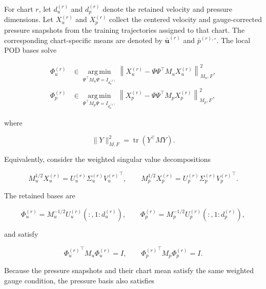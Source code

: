 \documentclass{article}
\begin{document}
For chart $r$, let $d_u^{(r)}$ and $d_p^{(r)}$ denote the retained velocity
and pressure dimensions.
Let $X_u^{(r)}$ and $X_p^{(r)}$ collect the centered velocity and
gauge-corrected pressure snapshots from the training trajectories assigned
to that chart.
The corresponding chart-specific means are denoted by
$\bar{\bm u}^{(r)}$ and $\bar p^{(r),\circ}$.
The local POD bases solve


\begin{align}
    \Phi_u^{(r)}
    &\in
    \underset{\Psi^\top M_u\Psi=I_{d_u^{(r)}}}
    {\operatorname{arg\,min}}
    \left\|
        X_u^{(r)}
        -\Psi\Psi^\top M_uX_u^{(r)}
    \right\|_{M_u,F}^2,
    \\
    \Phi_p^{(r)}
    &\in
    \underset{\Psi^\top M_p\Psi=I_{d_p^{(r)}}}
    {\operatorname{arg\,min}}
    \left\|
        X_p^{(r)}
        -\Psi\Psi^\top M_pX_p^{(r)}
    \right\|_{M_p,F}^2,
    \label{eq:app_pod_optimization}
\end{align}


where


\begin{equation}
    \|Y\|_{M,F}^2=\operatorname{tr}(Y^\top MY).
\end{equation}



Equivalently, consider the weighted singular value decompositions


\begin{equation}
    M_u^{1/2}X_u^{(r)}
    =
    U_u^{(r)}\Sigma_u^{(r)}{V_u^{(r)}}^\top,
    \qquad
    M_p^{1/2}X_p^{(r)}
    =
    U_p^{(r)}\Sigma_p^{(r)}{V_p^{(r)}}^\top.
\end{equation}


The retained bases are


\begin{equation}
    \Phi_u^{(r)}
    =
    M_u^{-1/2}
    U_u^{(r)}(:,1{:}d_u^{(r)}),
    \qquad
    \Phi_p^{(r)}
    =
    M_p^{-1/2}
    U_p^{(r)}(:,1{:}d_p^{(r)}),
    \label{eq:app_weighted_svd_bases}
\end{equation}


and satisfy


\begin{equation}
    {\Phi_u^{(r)}}^\top M_u\Phi_u^{(r)}=I,
    \qquad
    {\Phi_p^{(r)}}^\top M_p\Phi_p^{(r)}=I.
\end{equation}


Because the pressure snapshots and their chart mean satisfy the same weighted
gauge condition, the pressure basis also satisfies
\end{document}
